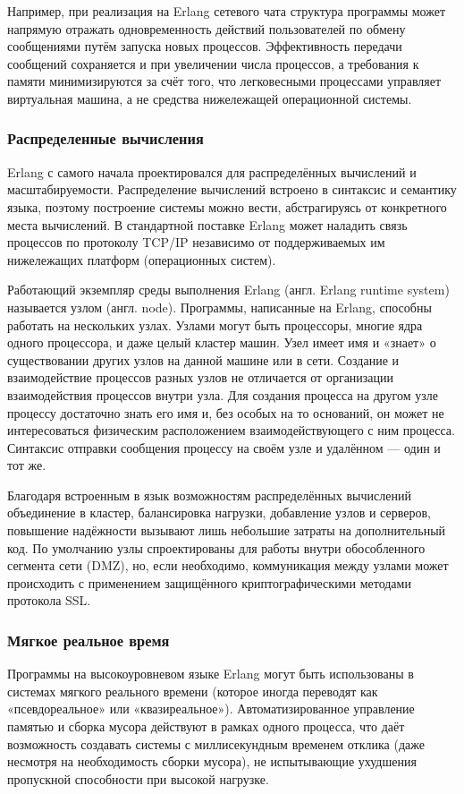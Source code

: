 \documentclass[12pt]{article}
\begin{document}
Например, при реализация на Erlang сетевого чата структура программы может напрямую отражать одновременность действий пользователей по обмену сообщениями путём запуска новых процессов. Эффективность передачи сообщений сохраняется и при увеличении числа процессов, а требования к памяти минимизируются за счёт того, что легковесными процессами управляет виртуальная машина, а не средства нижележащей операционной системы.

\subsubsection*{Распределенные вычисления}
Erlang с самого начала проектировался для распределённых вычислений и масштабируемости. Распределение вычислений встроено в синтаксис и семантику языка, поэтому построение системы можно вести, абстрагируясь от конкретного места вычислений. В стандартной поставке Erlang может наладить связь процессов по протоколу TCP/IP независимо от поддерживаемых им нижележащих платформ (операционных систем).

Работающий экземпляр среды выполнения Erlang (англ. Erlang runtime system) называется узлом (англ. node). Программы, написанные на Erlang, способны работать на нескольких узлах. Узлами могут быть процессоры, многие ядра одного процессора, и даже целый кластер машин. Узел имеет имя и «знает» о существовании других узлов на данной машине или в сети. Создание и взаимодействие процессов разных узлов не отличается от организации взаимодействия процессов внутри узла. Для создания процесса на другом узле процессу достаточно знать его имя и, без особых на то оснований, он может не интересоваться физическим расположением взаимодействующего с ним процесса. Синтаксис отправки сообщения процессу на своём узле и удалённом — один и тот же.

Благодаря встроенным в язык возможностям распределённых вычислений объединение в кластер, балансировка нагрузки, добавление узлов и серверов, повышение надёжности вызывают лишь небольшие затраты на дополнительный код. По умолчанию узлы спроектированы для работы внутри обособленного сегмента сети (DMZ), но, если необходимо, коммуникация между узлами может происходить с применением защищённого криптографическими методами протокола SSL.

\subsubsection*{Мягкое реальное время}
Программы на высокоуровневом языке Erlang могут быть использованы в системах мягкого реального времени (которое иногда переводят как «псевдореальное» или «квазиреальное»). Автоматизированное управление памятью и сборка мусора действуют в рамках одного процесса, что даёт возможность создавать системы с миллисекундным временем отклика (даже несмотря на необходимость сборки мусора), не испытывающие ухудшения пропускной способности при высокой нагрузке.
\end{document}
